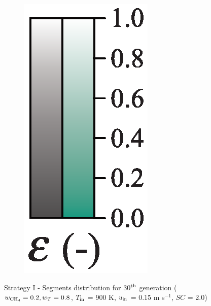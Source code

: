 \documentclass[preprint,12pt]{elsarticle}
\begin{document}
\begin{figure}[h!]
\begin{subfigure}[b]{0.1\textwidth}
     	\includegraphics[width=\textwidth]{segments_porosity.eps}
     \end{subfigure}
\caption{\label{fig:30L2080-seg} Strategy I - Segments distribution for 30$^{\rm{th}}$ generation ($w_{\rm{CH_4}} = 0.2, w_T = 0.8$, 	$T_{\rm{in}}$ = 900 K, $u_{\rm{in}}$ = 0.15 m s$^{-1}$, $SC$ = 2.0)}
\end{figure}
\end{document}
